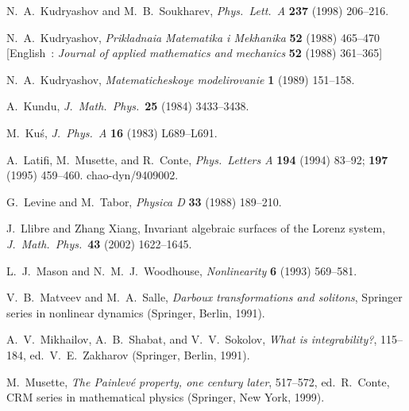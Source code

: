 \documentclass[10pt]{article}
\begin{document}
\begin{thebibliography}{99}
 N.~A.~Kudryashov and M.~B.~Soukharev,
{\it Phys.~Lett.~A} {\bf 237} (1998) 206--216.

 N.~A.~Kudryashov,
{\it Prikladnaia Matematika i Mekhanika} {\bf 52} (1988) 465--470
[English~:
{\it Journal of applied mathematics and mechanics} {\bf 52} (1988) 361--365]

 N.~A.~Kudryashov,
{\it Matematicheskoye modelirovanie} {\bf 1} (1989) 151--158.

 A.~Kundu,
{\it J.~Math.~Phys.}~{\bf 25} (1984) 3433--3438.

 M.~Ku\'s,
{\it J.~Phys.~A} {\bf 16} (1983) L689--L691.

 A.~Latifi, M.~Musette, and R.~Conte,
{\it Phys.~Letters A} {\bf 194} (1994) 83--92; {\bf 197} (1995) 459--460.
chao-dyn/9409002.

 G.~Levine and M.~Tabor,
{\it Physica D} {\bf 33} (1988) 189--210.

 J.~Llibre and Zhang Xiang,
Invariant algebraic surfaces of the Lorenz system,
{\it J.~Math.~Phys.}~{\bf 43} (2002) 1622--1645.

 L.~J.~Mason and N.~M.~J.~Woodhouse,
{\it Nonlinearity} {\bf 6} (1993) 569--581.

 V.~B.~Matveev and M.~A.~Salle,
{\it Darboux transformations and solitons},
Springer series in nonlinear dynamics
(Springer, Berlin, 1991).

 A.~V.~Mikhailov, A.~B.~Shabat, and V.~V.~Sokolov,
{\it What is integrability?}, 
115--184,
ed.~V.~E.~Zakharov
(Springer, Berlin, 1991).

 M.~Musette,
{\it The Painlev\'e property, one century later},
517--572,
ed.~R.~Conte,
CRM series in mathematical physics (Springer, New York, 1999).


\end{thebibliography}
\end{document}
